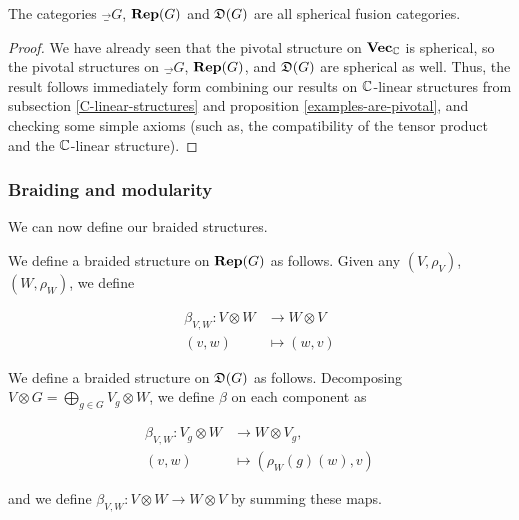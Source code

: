 \begin{cor} The categories $\Vec_G$, ${\bf Rep}(G)$ and ${\mathfrak D}(G)$ are all spherical fusion categories.
\end{cor}
\begin{proof}We have already seen that the pivotal structure on ${\bf Vec}_{{\mathbb C}}$ is spherical, so the pivotal structures on $\Vec_G$, ${\bf Rep}(G)$, and ${\mathfrak D}(G)$ are spherical as well. Thus, the result follows immediately form combining our results on ${\mathbb C}$-linear structures from subsection \ref{C-linear-structures} and proposition \ref{examples-are-pivotal}, and checking some simple axioms (such as, the compatibility of the tensor product and the ${\mathbb C}$-linear structure).
\end{proof}

\subsubsection{Braiding and modularity}

We can now define our braided structures.

\begin{defn} We define a braided structure on ${\bf Rep}(G)$ as follows. Given any $(V,\rho_V)$, $(W,\rho_W)$, we define

\begin{align*}
\beta_{V,W}:V\otimes W&\to W\otimes V \\
(v,w)&\mapsto (w,v)
\end{align*}

We define a braided structure on ${\mathfrak D}(G)$ as follows. Decomposing $V\otimes G= \bigoplus_{g\in G}V_g\otimes W$, we define $\beta$ on each component as

\begin{align*}
\beta_{V,W}:V_g\otimes W&\to W\otimes V_g,\\
(v,w)&\mapsto (\rho_W(g)(w),v)
\end{align*}

and we define $\beta_{V,W}:V\otimes W\to W\otimes V$ by summing these maps.
\end{defn}

